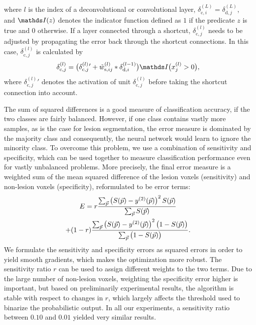where $l$ is the index of a deconvolutional or convolutional layer,
$\delta^{(L)}_{\text{c},i} = \delta^{(L)}_{\text{d},j}$, and $\I(z)$ denotes the
indicator function defined as $1$ if the predicate $z$ is true and $0$
otherwise. If a layer connected through a shortcut,
$\delta^{(l)}_{\text{c},j}$ needs to be adjusted by propagating the error back
through the shortcut connections. In this case, $\delta^{(l)}_{\text{c},j}$ is
calculated by
\begin{equation}
\delta^{(l)}_{\text{c},j} =
\big(\delta^{(l)}_{\text{c},j}{}'+
\tilde{w}^{(l)}_{\text{s},ij}*\delta^{(l-1)}_{\text{d},i}\big)\I\big(x^{(l)}_j
> 0\big),
\label{eq:deltas}
\end{equation}
where $\delta^{(l)}_{\text{c},j}{}'$ denotes the activation of unit
$\delta^{(l)}_{\text{c},j}$ before taking the shortcut connection into account.


The sum of squared differences is a good measure of classification accuracy, if
the two classes are fairly balanced. However, if one class contains vastly more
samples, as is the case for lesion segmentation, the error measure is dominated
by the majority class and consequently, the neural network would learn to ignore
the minority class. To overcome this problem, we use a combination of
sensitivity and specificity, which can be used together to measure
classification performance even for vastly unbalanced problems. More precisely,
the final error measure is a weighted sum of the mean squared difference of the
lesion voxels (sensitivity) and non-lesion voxels (specificity), reformulated to
be error terms:
\begin{multline} 
E = r\frac{\textstyle\sum_{\vect{p}} \left(S(\vect{p}) -
y^{(2)}(\vect{p})\right)^2 S(\vect{p})}{\textstyle\sum_{\vect{p}} S(\vect{p})}
\\
 + (1-r)\frac{\textstyle\sum_{\vect{p}} \left(S(\vect{p}) -
y^{(2)}(\vect{p})\right)^2 \big(1 - S(\vect{p})\big)}{%
\textstyle\sum_{\vect{p}}\big(1 - S(\vect{p})\big)}.
\end{multline}
We formulate the sensitivity and specificity errors as squared errors in order
to yield smooth gradients, which makes the optimization more robust. The
sensitivity ratio $r$ can be used to assign different weights to the two terms.
Due to the large number of non-lesion voxels, weighting the specificity error
higher is important, but based on preliminarily experimental results, the
algorithm is stable with respect to changes in $r$, which largely affects the
threshold used to binarize the probabilistic output. In all our experiments, a
sensitivity ratio between $0.10$ and $0.01$ yielded very similar results.

